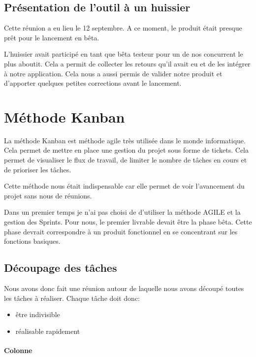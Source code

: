 \documentclass[]{report}
\begin{document}
    \subsection{Présentation de l’outil à un huissier}

      Cette réunion a eu lieu le 12 septembre. A ce moment, le produit était presque prêt pour le lancement en bêta.

      L'huissier avait participé en tant que bêta testeur pour un de nos concurrent le plus aboutit. Cela a permit de collecter les retours qu'il avait eu et de les intégrer à notre application. Cela nous a aussi permis de valider notre produit et d'apporter quelques petites corrections avant le lancement.

  \section{Méthode Kanban}

    La méthode Kanban est méthode agile très utilisée dans le monde informatique. Cela permet de mettre en place une gestion du projet sous forme de tickets. Cela permet de visualiser le flux de travail, de limiter le nombre de tâches en cours et de prioriser les tâches.

    Cette méthode nous était indispensable car elle permet de voir l'avancement du projet sans nous  de réunions.

    Dans un premier temps je n'ai pas choisi de d'utiliser la méthode AGILE et la gestion des Sprints. Pour nous, le premier livrable devait être la phase bêta. Cette phase devrait correspondre à un produit fonctionnel en se concentrant sur les fonctions basiques.

    \subsection{Découpage des tâches}

      Nous avons donc fait une réunion autour de laquelle nous avons découpé toutes les tâches à réaliser. Chaque tâche doit donc:

      \begin{itemize}
        \item être indivisible
        \item réalisable rapidement
      \end{itemize}

      \paragraph{Colonne }
\end{document}
